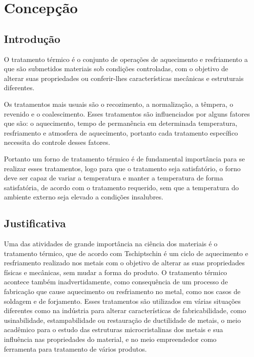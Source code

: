 \chapter[Concepção]{Concepção}

\section{Introdução}

O tratamento térmico é o conjunto de operações de aquecimento e resfriamento a que são submetidos materiais sob condições controladas, com o objetivo de alterar suas propriedades ou conferir-lhes características mecânicas e estruturais diferentes.

Os tratamentos mais usuais são o recozimento, a normalização, a têmpera, o revenido e o coalescimento. Esses tratamentos são influenciados por alguns fatores que são: o aquecimento, tempo de permanência em determinada temperatura, resfriamento e atmosfera de aquecimento, portanto cada tratamento específico necessita do controle desses fatores.

Portanto um forno de tratamento térmico é de fundamental importância para se realizar esses tratamentos, logo para que o tratamento seja satisfatório, o forno deve ser capaz de variar a temperatura e manter a temperatura de forma satisfatória, de acordo com o tratamento requerido, sem que a temperatura do ambiente externo seja elevado a condições insalubres.

\section{Justificativa}

Uma das atividades de grande importância na ciência dos materiais é o tratamento térmico, que de acordo com Tschiptschin é um ciclo de aquecimento e resfriamento realizado nos metais com o objetivo de alterar as suas propriedades físicas e mecânicas, sem mudar a forma do produto. O tratamento térmico acontece também inadvertidamente, como consequência de um processo de fabricação que cause aquecimento ou resfriamento no metal, como nos casos de soldagem e de forjamento. Esses tratamentos são utilizados em várias situações diferentes como na indústria para alterar características de fabricabilidade, como usinabilidade, estampabilidade ou restauração de ductilidade de metais, o meio acadêmico para o estudo das estruturas microcristalinas dos metais e sua influência nas propriedades do material, e no meio empreendedor como ferramenta para tratamento de vários produtos.

